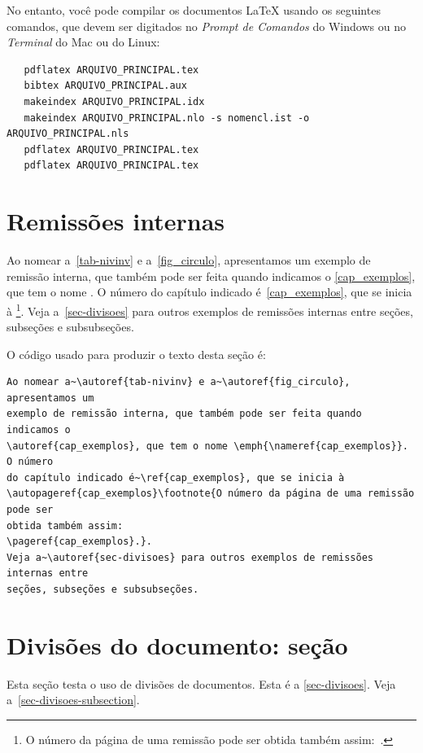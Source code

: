 No entanto, você pode compilar os documentos \LaTeX{} usando os seguintes
comandos, que devem ser digitados no \emph{Prompt de Comandos} do Windows ou no
\emph{Terminal} do Mac ou do Linux:

\begin{verbatim}
   pdflatex ARQUIVO_PRINCIPAL.tex
   bibtex ARQUIVO_PRINCIPAL.aux
   makeindex ARQUIVO_PRINCIPAL.idx
   makeindex ARQUIVO_PRINCIPAL.nlo -s nomencl.ist -o ARQUIVO_PRINCIPAL.nls
   pdflatex ARQUIVO_PRINCIPAL.tex
   pdflatex ARQUIVO_PRINCIPAL.tex
\end{verbatim}

\section{Remissões internas}

Ao nomear a~\autoref{tab-nivinv} e a~\autoref{fig_circulo}, apresentamos um
exemplo de remissão interna, que também pode ser feita quando indicamos o
\autoref{cap_exemplos}, que tem o nome \emph{}. O número
do capítulo indicado é~\ref{cap_exemplos}, que se inicia à
\footnote{O número da página de uma remissão pode ser
obtida também assim:~\pageref{cap_exemplos}.}.
Veja a~\autoref{sec-divisoes} para outros exemplos de remissões internas entre
seções, subseções e subsubseções.

O código usado para produzir o texto desta seção é:

\begin{verbatim}
Ao nomear a~\autoref{tab-nivinv} e a~\autoref{fig_circulo}, apresentamos um
exemplo de remissão interna, que também pode ser feita quando indicamos o
\autoref{cap_exemplos}, que tem o nome \emph{\nameref{cap_exemplos}}. O número
do capítulo indicado é~\ref{cap_exemplos}, que se inicia à
\autopageref{cap_exemplos}\footnote{O número da página de uma remissão pode ser
obtida também assim:
\pageref{cap_exemplos}.}.
Veja a~\autoref{sec-divisoes} para outros exemplos de remissões internas entre
seções, subseções e subsubseções.
\end{verbatim}

\section{Divisões do documento: seção}%
\label{sec-divisoes}

Esta seção testa o uso de divisões de documentos. Esta é a
\autoref{sec-divisoes}. Veja a~\autoref{sec-divisoes-subsection}.

